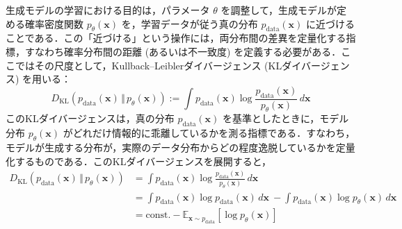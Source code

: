 \documentclass[titlepage]{ltjsbook}
\begin{document}
\begin{comment}
\section{生成モデル}
生成モデルとは，学習データに内在する特徴や構造を学習し，それに基づいて新たなデータを生成するモデルである．ここで，学習対象となる観測データ (例えば感覚入力) を $\mathbf{x} \in \mathbb{R}^d$ とし，それらが従う真の確率密度関数を $p_{\mathrm{data}}(\cdot)$ と表す．この密度関数 $p_{\mathrm{data}}(\cdot)$ は，実世界においてデータがどのように生成されるかを記述するものであり，$\mathbf{x}$ における確率密度は $p_{\mathrm{data}}(\mathbf{x})$ で与えられる．このような密度関数 $p_{\mathrm{data}}(\cdot)$ が既知であれば，任意のサンプル $\mathbf{x}$ をそこから生成 (サンプリング) することができる．しかし現実には，$p_{\mathrm{data}}(\cdot)$ は明示的な形では与えられておらず，ほとんどの場合において未知である．観測データがある確率的な生成過程に従って生じたと仮定し，その過程を表現するために，パラメータ $\theta$ をもつ確率密度関数 $p_\theta(\mathbf{x})$ を導入する．ここで，$p_\theta(\mathbf{x})$ は，観測変数 $\mathbf{x}$ に対する条件付き分布 $p(\mathbf{x} \mid \theta)$ の略記である．このような分布 $p_\theta(\mathbf{x})$ を定めるモデルを，生成モデル (generative model) と呼ぶ．
\end{comment}
生成モデルの学習における目的は，パラメータ $\theta$ を調整して，生成モデルが定める確率密度関数 $p_\theta(\mathbf{x})$ を，学習データが従う真の分布 $p_{\mathrm{data}}(\mathbf{x})$ に近づけることである．この「近づける」という操作には，両分布間の差異を定量化する指標，すなわち確率分布間の距離 (あるいは不一致度) を定義する必要がある．ここではその尺度として，Kullback–Leiblerダイバージェンス (KLダイバージェンス) を用いる：
\begin{equation}
D_{\mathrm{KL}}\left(p_{\mathrm{data}}(\mathbf{x}) \,\Vert\, p_\theta(\mathbf{x})\right)
:= \int p_{\mathrm{data}}(\mathbf{x}) \log \frac{p_{\mathrm{data}}(\mathbf{x})}{p_\theta(\mathbf{x})} \, d\mathbf{x}
\end{equation}
このKLダイバージェンスは，真の分布 $p_{\mathrm{data}}(\mathbf{x})$ を基準としたときに，モデル分布 $p_\theta(\mathbf{x})$ がどれだけ情報的に乖離しているかを測る指標である．すなわち，モデルが生成する分布が，実際のデータ分布からどの程度逸脱しているかを定量化するものである．このKLダイバージェンスを展開すると，
\begin{align}
D_{\mathrm{KL}}\left(p_{\mathrm{data}}(\mathbf{x}) \,\Vert\, p_\theta(\mathbf{x})\right)
&= \int p_{\mathrm{data}}(\mathbf{x}) \log \frac{p_{\mathrm{data}}(\mathbf{x})}{p_\theta(\mathbf{x})} \, d\mathbf{x} \\
&= \int p_{\mathrm{data}}(\mathbf{x}) \log p_{\mathrm{data}}(\mathbf{x}) \, d\mathbf{x} 
\ - \int p_{\mathrm{data}}(\mathbf{x}) \log p_\theta(\mathbf{x}) \, d\mathbf{x} \\
&= \text{const.} - \mathbb{E}_{\mathbf{x} \sim p_{\mathrm{data}}} \left[ \log p_\theta(\mathbf{x}) \right]
\end{align}
\end{document}
